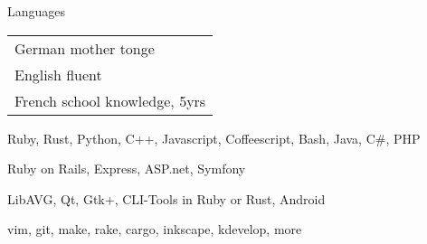 \begin{cvskills}
  \cvskill
  {Languages}
  {\def\arraystretch{1}
    \begin{tabular}[]{l}
      German \hspace{4.9mm} mother tonge \\
      English \hspace{6mm} fluent \\
      French \hspace{6.6mm} school knowledge, 5yrs
    \end{tabular}
    \def\arraystretch{1.2}
  }
  {Ruby, Rust, Python, C++, Javascript, Coffeescript, Bash, Java, C\#, PHP}

  {Ruby on Rails, Express, ASP.net, Symfony}

  {LibAVG, Qt, Gtk+, CLI-Tools in Ruby or Rust, Android}

  {vim, git, make,
  rake, cargo, inkscape,
kdevelop, more}
\end{cvskills}
